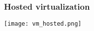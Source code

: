 \begin{frame}
\frametitle{Hosted virtualization}
    \center\texttt{[image: vm\_hosted.png]}
\end{frame}

